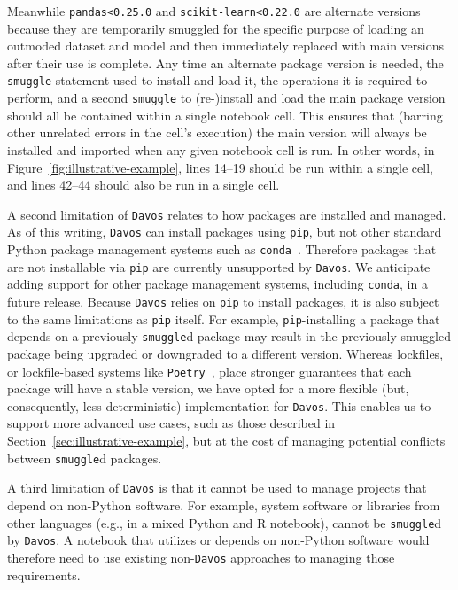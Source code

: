 \documentclass[preprint,12pt,a4paper]{elsarticle}
\begin{document}
Meanwhile \texttt{pandas<0.25.0} and \texttt{scikit-learn<0.22.0} are alternate versions because they are temporarily smuggled for the specific purpose of loading an outmoded dataset and model and then immediately replaced with main versions after their use is complete.
Any time an alternate package version is needed, the \texttt{smuggle} statement used to install and load it, the operations it is required to perform, and a second \texttt{smuggle} to (re-)install and load the main package version should all be contained within a single notebook cell.
This ensures that (barring other unrelated errors in the cell's execution) the main version will always be installed and imported when any given notebook cell is run.
In other words, in Figure~\ref{fig:illustrative-example}, lines 14--19 should be run within a single cell, and lines 42--44 should also be run in a single cell.

A second limitation of \texttt{Davos} relates to how packages are installed and managed.
As of this writing, \texttt{Davos} can install packages using \texttt{pip}, but not
other standard Python package management systems such as \texttt{conda}~\cite{Anac12}.
Therefore packages that are not installable via \texttt{pip} are currently
unsupported by \texttt{Davos}. We anticipate adding support for other package management
systems, including \texttt{conda}, in a future release.  Because \texttt{Davos} relies on
\texttt{pip} to install packages, it is also subject to the same limitations as
\texttt{pip} itself. For example, \texttt{pip}-installing a package that depends on
a previously \texttt{smuggle}d package may result in the previously smuggled package
being upgraded or downgraded to a different version. Whereas lockfiles, or lockfile-based
systems like \texttt{Poetry}~\cite{Eust19}, place stronger guarantees that each package will
have a stable version, we have opted for a more flexible (but, consequently, less
deterministic) implementation for \texttt{Davos}.  This enables us to support
more advanced use cases, such as those described in Section~\ref{sec:illustrative-example},
but at the cost of managing potential conflicts between \texttt{smuggle}d
packages.

A third limitation of \texttt{Davos} is that it cannot be used to manage projects that
depend on non-Python software. For example, system software or libraries from
other languages (e.g., in a mixed Python and R notebook), cannot be
\texttt{smuggle}d by \texttt{Davos}. A notebook that utilizes or depends on non-Python
software would therefore need to use existing non-\texttt{Davos} approaches to managing
those requirements.
\end{document}
